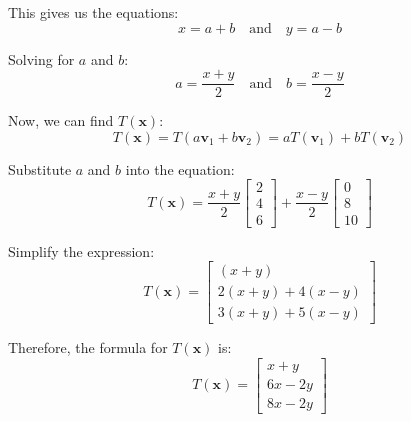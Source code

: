 \documentclass{article}
\begin{document}
\begin{enumerate}
This gives us the equations:
\[
x = a + b \quad \text{and} \quad y = a - b
\]

Solving for \(a\) and \(b\):
\[
a = \frac{x + y}{2} \quad \text{and} \quad b = \frac{x - y}{2}
\]

Now, we can find \(T(\mathbf{x})\):
\[
T(\mathbf{x}) = T(a \mathbf{v}_1 + b \mathbf{v}_2) = a T(\mathbf{v}_1) + b T(\mathbf{v}_2)
\]

Substitute \(a\) and \(b\) into the equation:
\[
T(\mathbf{x}) = \frac{x + y}{2} \begin{bmatrix} 2 \\ 4 \\ 6 \end{bmatrix} + \frac{x - y}{2} \begin{bmatrix} 0 \\ 8 \\ 10 \end{bmatrix}
\]

Simplify the expression:
\[
T(\mathbf{x}) = \begin{bmatrix} (x + y) \\ 2(x + y) + 4(x - y) \\ 3(x + y) + 5(x - y) \end{bmatrix}
\]

Therefore, the formula for \(T(\mathbf{x})\) is:
\[
T(\mathbf{x}) = \begin{bmatrix} x + y \\ 6x - 2y \\ 8x - 2y \end{bmatrix}
\]

\end{enumerate}
\end{document}

